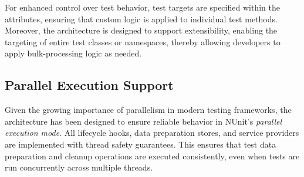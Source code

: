 For enhanced control over test behavior, test targets are specified within the attributes, ensuring that custom logic is applied to individual test methods. Moreover, the architecture is designed to support extensibility, enabling the targeting of entire test classes or namespaces, thereby allowing developers to apply bulk-processing logic as needed.

\subsection{Parallel Execution Support}
Given the growing importance of parallelism in modern testing frameworks, the architecture has been designed to ensure reliable behavior in NUnit's \textit{parallel execution mode}. All lifecycle hooks, data preparation stores, and service providers are implemented with thread safety guarantees. This ensures that test data preparation and cleanup operations are executed consistently, even when tests are run concurrently across multiple threads.

